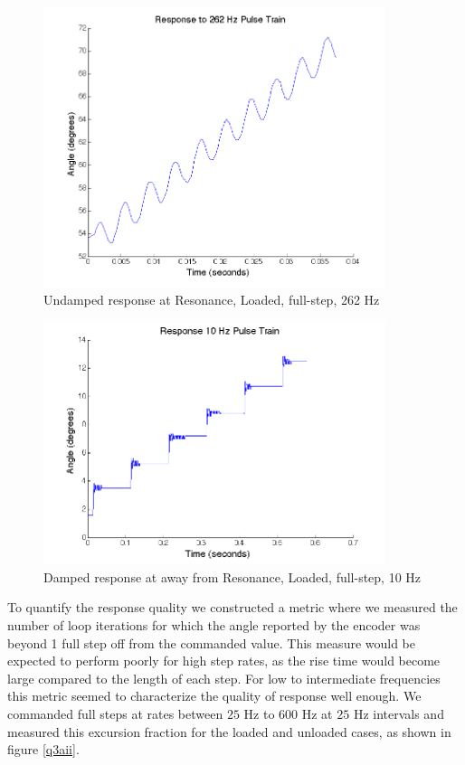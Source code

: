 \documentclass{article}
\theoremstyle{plain}
\theoremstyle{definition}
\theoremstyle{remark}
\begin{document}
\begin{figure}[hbt]
\begin{center}
\includegraphics[width = 10cm]{262Hz_Response.png}
\caption{Undamped response at Resonance, Loaded, full-step, 262 Hz}
\label{Q3_aii1}
\end{center}
\end{figure}

\begin{figure}[hbt]
\begin{center}
\includegraphics[width = 10cm]{10Hz_Response.png}
\caption{Damped response at away from Resonance, Loaded, full-step, 10 Hz}
\label{Q3_aii2}
\end{center}
\end{figure}

To quantify the response quality we constructed a metric where we measured the number of loop iterations for which the angle reported by the encoder was beyond 1 full step off from the commanded value.  This measure would be expected to perform poorly for high step rates, as the rise time would become large compared to the length of each step.  For low to intermediate frequencies this metric seemed to characterize the quality of response well enough.  We commanded full steps at rates between $25$ Hz to $600$ Hz at $25$ Hz intervals and measured this excursion fraction for the loaded and unloaded cases, as shown in figure \ref{q3aii}.\\
\end{document}
